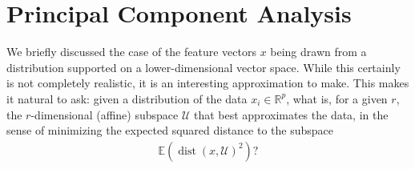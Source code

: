 \documentclass{article}
\newcommand{\calU}{\mathcal{U}}
\newcommand{\R}{\mathbb{R}}
\DeclareMathOperator{\dist}{dist}
\begin{document}
\section{Principal Component Analysis}

We briefly discussed the case of the feature vectors $x$ being drawn from a distribution supported on a lower-dimensional vector space. While this certainly is not completely realistic, it is an interesting approximation to make. This makes it natural to ask: given a distribution of the data $x_i \in \R^p$, what is, for a given $r$, the $r$-dimensional (affine) subspace $\calU$ that best approximates the data, in the sense of minimizing the expected squared distance to the subspace
\begin{align*}
    \mathbb{E}(\dist(x,\calU)^2)?
\end{align*}
\end{document}
